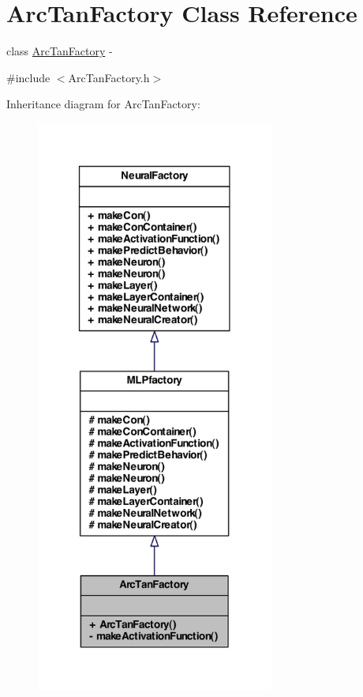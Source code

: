 \hypertarget{class_arc_tan_factory}{
\section{ArcTanFactory Class Reference}
\label{class_arc_tan_factory}
}


class \hyperlink{class_arc_tan_factory}{ArcTanFactory} -\/  




{\ttfamily \#include $<$ArcTanFactory.h$>$}



Inheritance diagram for ArcTanFactory:
\nopagebreak
\begin{figure}[H]
\begin{center}
\leavevmode
\includegraphics[width=222pt]{class_arc_tan_factory__inherit__graph}
\end{center}
\end{figure}


